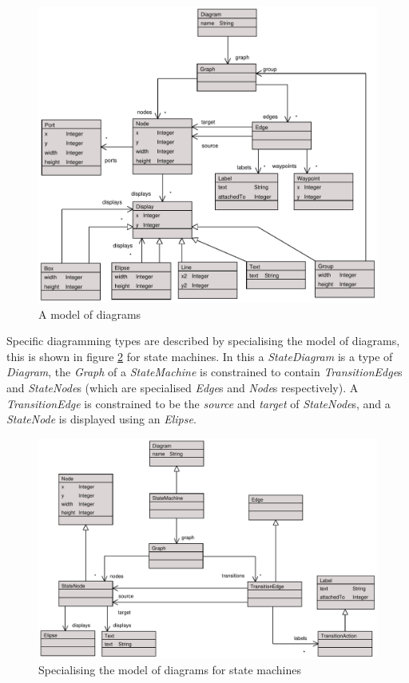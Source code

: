 \begin{figure}[h]
\begin{center}
\includegraphics[width=15cm]{ConcreteSyntax/figures/diagramModel.pdf}
\caption{A model of diagrams}
\label{modelOfDiagrams}
\end{center}
\end{figure}

Specific diagramming types are described by specialising the model of diagrams, this is shown in figure \ref{stateMachineDiagram} for state machines.  In this a \emph{StateDiagram} is a type of \emph{Diagram}, the \emph{Graph} of a \emph{StateMachine} is constrained to contain \emph{TransitionEdge}s and \emph{StateNode}s
(which are specialised \emph{Edge}s and \emph{Node}s respectively). A \emph{TransitionEdge} is constrained to be the \emph{source} and \emph{target} of \emph{StateNode}s, and a \emph{StateNode} is displayed using an \emph{Elipse}.

\begin{figure}[h]
\begin{center}
\includegraphics[width=16cm]{ConcreteSyntax/figures/stateMachineSyntax.pdf}
\caption{Specialising the model of diagrams for state machines}
\label{stateMachineDiagram}
\end{center}
\end{figure}

